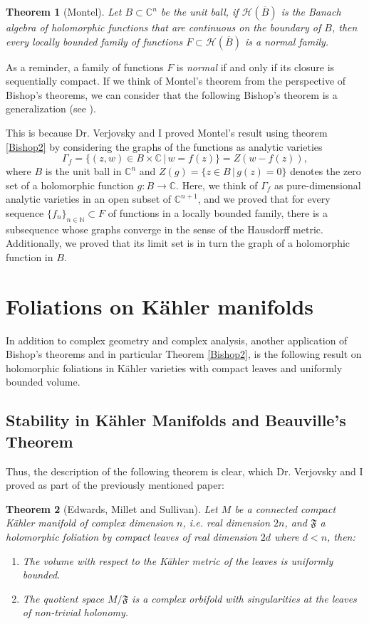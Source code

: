 \documentclass[12pt,twoside,a4paper]{report}
\newtheorem{theorem}{Theorem}[section]
\newcommand{\nat}{\ensuremath{ \mathbb N }}
\newcommand{\co}{\ensuremath{\mathbb C }}
\newcommand{\con}{\ensuremath{\mathbb{C}^n}}
\begin{document}
\begin{theorem}[Montel]\label{Montel}
        Let $B\subset\con$ be the unit ball, if $\mathcal{H}(\overline{B})$ is the Banach algebra of holomorphic functions that are continuous
        on the boundary of $B$, then every locally bounded family of functions $F\subset\mathcal{H}(\overline{B})$ is a \textit{normal} family.
\end{theorem}
As a reminder, a family of functions $F$ is \textit{normal} if and only if its closure is sequentially compact.
If we think of Montel's theorem from the perspective of Bishop's theorems, we can consider that the following Bishop's theorem is a
generalization (see \cite[p. 30]{Stolzenberg}).

This is because Dr. Verjovsky and I proved Montel's result using theorem \ref{Bishop2} by considering the graphs of the
functions as analytic varieties
\[
        \Gamma_{f}=\{(z,w)\in B\times\co\,|\,w=f(z)\}=Z(w-f(z)),
\]
\noindent where $B$ is the unit ball in $\con$ and $Z(g)=\{z\in B\,|\,g(z)=0\}$ denotes the zero set of a holomorphic function $g:B\rightarrow\co$. Here, we think of $\Gamma_{f}$ as pure-dimensional analytic varieties in an open subset of $\co^{n+1}$, and we proved
that for every sequence $\{f_n\}_{n\in\nat}\subset F$ of functions in a locally bounded family, there is a subsequence
whose graphs converge in the sense of the Hausdorff metric. Additionally, we proved that its limit set
is in turn the graph of a holomorphic function in $B$.




\section{Foliations on Kähler manifolds}
\noindent In addition to complex geometry and complex analysis, another application of Bishop's theorems and in particular Theorem
\ref{Bishop2}, is the following result on holomorphic foliations in K\"ahler varieties with compact leaves and uniformly bounded volume.

\subsection{Stability in K\"ahler Manifolds and Beauville's Theorem}

\noindent Thus, the description of the following theorem is clear, which Dr. Verjovsky and I proved as part of the previously mentioned paper:
\begin{theorem}[Edwards, Millet and Sullivan]\label{EMS}
        Let $M$ be a connected compact K\"ahler manifold of complex dimension $n$, i.e. real dimension $2n$, and $\mathfrak{F}$ a holomorphic foliation by compact
        leaves of real dimension $2d$ where $d<n$, then:
        \begin{enumerate}
                \item[a)] The volume with respect to the K\"ahler metric of the leaves is uniformly bounded.
                \item[b)] The quotient space $M/\mathfrak{F}$ is a complex orbifold with singularities at the leaves of non-trivial holonomy.
        \end{enumerate}
\end{theorem}
\end{document}
